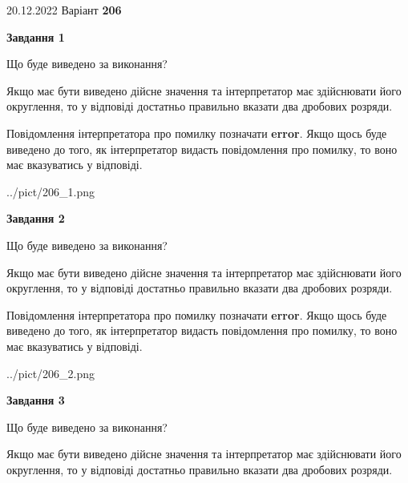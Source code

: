 \documentclass[12pt, ukrainian]{article}
\begin{document}
{20.12.2022 Варіант \No \textbf { 206 }\par}
{
\begin {Large}

{\begin {center}\textbf{Завдання 1}\end {center}}\par
Що буде виведено за виконання? \par

Якщо має бути виведено дійсне значення та інтерпретатор має здійснювати його округлення, 
то у відповіді достатньо правильно вказати два дробових розряди.

Повідомлення інтерпретатора про помилку позначати \textbf{error}.
Якщо щось буде виведено до того, як інтерпретатор видасть повідомлення про помилку, 
то воно має вказуватись у відповіді. \par

\begin{center}
	{../pict/206_1.png}
\end{center}
\newpage

{\begin {center}\textbf{Завдання 2}\end {center}}\par
Що буде виведено за виконання? \par

Якщо має бути виведено дійсне значення та інтерпретатор має здійснювати його округлення, 
то у відповіді достатньо правильно вказати два дробових розряди.

Повідомлення інтерпретатора про помилку позначати \textbf{error}.
Якщо щось буде виведено до того, як інтерпретатор видасть повідомлення про помилку, 
то воно має вказуватись у відповіді. \par

\begin{center}
	{../pict/206_2.png}
\end{center}
\newpage

{\begin {center}\textbf{Завдання 3}\end {center}}\par
Що буде виведено за виконання? \par

Якщо має бути виведено дійсне значення та інтерпретатор має здійснювати його округлення, 
то у відповіді достатньо правильно вказати два дробових розряди.


\end{Large}}
\end{document}
